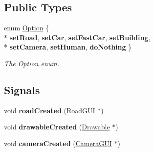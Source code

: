 \subsection*{Public Types}
\begin{DoxyCompactItemize}
\item 
enum \hyperlink{classEventInterpreter_a1b63d40701a33e256a8cbbf44c6be8d2}{Option} \{ \\*
{\bfseries set\-Road}, 
{\bfseries set\-Car}, 
{\bfseries set\-Fast\-Car}, 
{\bfseries set\-Building}, 
\\*
{\bfseries set\-Camera}, 
{\bfseries set\-Human}, 
{\bfseries do\-Nothing}
 \}
\begin{DoxyCompactList}\small\item\em The Option enum. \end{DoxyCompactList}\end{DoxyCompactItemize}
\subsection*{Signals}
\begin{DoxyCompactItemize}
\item 
\hypertarget{classEventInterpreter_a58713917f8a69790e37a7f6b7c507876}{void {\bfseries road\-Created} (\hyperlink{classRoadGUI}{Road\-G\-U\-I} $\ast$)}\label{classEventInterpreter_a58713917f8a69790e37a7f6b7c507876}

\item 
\hypertarget{classEventInterpreter_a0920b5e9443c614e443b65a853d5e7f1}{void {\bfseries drawable\-Created} (\hyperlink{classDrawable}{Drawable} $\ast$)}\label{classEventInterpreter_a0920b5e9443c614e443b65a853d5e7f1}

\item 
\hypertarget{classEventInterpreter_a737c2f2f409b24fe35f8aab0e07af7dc}{void {\bfseries camera\-Created} (\hyperlink{classCameraGUI}{Camera\-G\-U\-I} $\ast$)}\label{classEventInterpreter_a737c2f2f409b24fe35f8aab0e07af7dc}

\end{DoxyCompactItemize}
